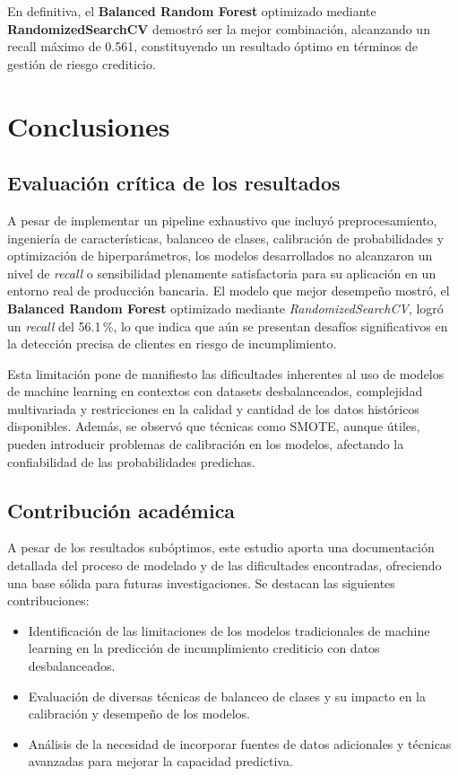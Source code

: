 \documentclass[journal]{apa7}
\begin{document}
En definitiva, el \textbf{Balanced Random Forest} optimizado mediante \textbf{RandomizedSearchCV} demostró ser la mejor combinación, alcanzando un recall máximo de 0.561, constituyendo un resultado óptimo en términos de gestión de riesgo crediticio.

\section{Conclusiones}

\subsection{Evaluación crítica de los resultados}

A pesar de implementar un pipeline exhaustivo que incluyó preprocesamiento, ingeniería de características, balanceo de clases, calibración de probabilidades y optimización de hiperparámetros, los modelos desarrollados no alcanzaron un nivel de \emph{recall} o sensibilidad plenamente satisfactoria para su aplicación en un entorno real de producción bancaria. El modelo que mejor desempeño mostró, el \textbf{Balanced Random Forest} optimizado mediante \emph{RandomizedSearchCV}, logró un \emph{recall} del 56.1\,\%, lo que indica que aún se presentan desafíos significativos en la detección precisa de clientes en riesgo de incumplimiento.

Esta limitación pone de manifiesto las dificultades inherentes al uso de modelos de machine learning en contextos con datasets desbalanceados, complejidad multivariada y restricciones en la calidad y cantidad de los datos históricos disponibles. Además, se observó que técnicas como SMOTE, aunque útiles, pueden introducir problemas de calibración en los modelos, afectando la confiabilidad de las probabilidades predichas.

\subsection{Contribución académica}

A pesar de los resultados subóptimos, este estudio aporta una documentación detallada del proceso de modelado y de las dificultades encontradas, ofreciendo una base sólida para futuras investigaciones. Se destacan las siguientes contribuciones:
\begin{itemize}
  \item Identificación de las limitaciones de los modelos tradicionales de machine learning en la predicción de incumplimiento crediticio con datos desbalanceados.
  \item Evaluación de diversas técnicas de balanceo de clases y su impacto en la calibración y desempeño de los modelos.
  \item Análisis de la necesidad de incorporar fuentes de datos adicionales y técnicas avanzadas para mejorar la capacidad predictiva.
\end{itemize}
\end{document}
